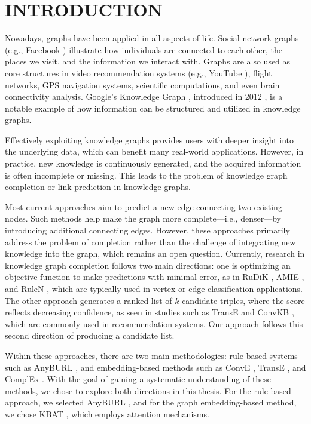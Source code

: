 \chapter{INTRODUCTION}
\label{chap:Introduction}

Nowadays, graphs have been applied in all aspects of life. Social network graphs (e.g., Facebook \cite{ugander2011anatomy}) illustrate how individuals are connected to each other, the places we visit, and the information we interact with. Graphs are also used as core structures in video recommendation systems (e.g., YouTube \cite{baluja2008video}), flight networks, GPS navigation systems, scientific computations, and even brain connectivity analysis. Google’s Knowledge Graph \cite{googlekg:2020}, introduced in 2012 \cite{ji2020survey}, is a notable example of how information can be structured and utilized in knowledge graphs.

Effectively exploiting knowledge graphs provides users with deeper insight into the underlying data, which can benefit many real-world applications. However, in practice, new knowledge is continuously generated, and the acquired information is often incomplete or missing. This leads to the problem of knowledge graph completion or link prediction in knowledge graphs.

Most current approaches aim to predict a new edge connecting two existing nodes. Such methods help make the graph more complete—i.e., denser—by introducing additional connecting edges. However, these approaches primarily address the problem of completion rather than the challenge of integrating new knowledge into the graph, which remains an open question. Currently, research in knowledge graph completion follows two main directions: one is optimizing an objective function to make predictions with minimal error, as in RuDiK \cite{ortona2018robust}, AMIE \cite{galarraga2015fast}, and RuleN \cite{meilicke2018fine}, which are typically used in vertex or edge classification applications. The other approach generates a ranked list of \(k\) candidate triples, where the score reflects decreasing confidence, as seen in studies such as TransE \cite{bordes2013translating} and ConvKB \cite{vu2019capsule}, which are commonly used in recommendation systems. Our approach follows this second direction of producing a candidate list.

Within these approaches, there are two main methodologies: rule-based systems such as AnyBURL \cite{burl}, and embedding-based methods such as ConvE \cite{dettmers2017convolutional}, TransE \cite{bordes2013translating}, and ComplEx \cite{trouillon2016complex}. With the goal of gaining a systematic understanding of these methods, we chose to explore both directions in this thesis. For the rule-based approach, we selected AnyBURL \cite{burl}, and for the graph embedding-based method, we chose KBAT \cite{nathani2019learning}, which employs attention mechanisms.

